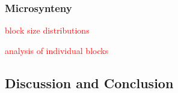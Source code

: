 \subsubsection{Microsynteny}

\textcolor{red}{block size distributions}

\textcolor{red}{analysis of individual blocks}

\subsection{Discussion and Conclusion}